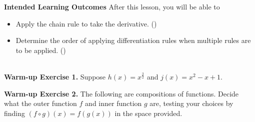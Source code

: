 \documentclass[10pt]{article}
\begin{document}
\pagestyle{otherpages}
\thispagestyle{firstpage}

\textbf{Intended Learning Outcomes}
After this lesson, you will be able to 

\begin{itemize}
    \item Apply the chain rule to take the derivative. ()
    \item Determine the order of applying differentiation rules when multiple rules are to be applied. ()
\end{itemize}

\vspace{-0.5cm}

\hrulefill

{\bf {}}\\
{\bf\color{blue}Warm-up Exercise 1.} Suppose $h(x) = x^{\frac{3}{2}}$ and $j(x) = x^2 - x+1$.


{\bf\color{blue}Warm-up Exercise 2.} The following are compositions of functions. Decide what the outer function $f$ and inner function $g$ are, testing your choices by finding $(f\circ g)(x)=f(g(x))$ in the space provided.\\
\end{document}
